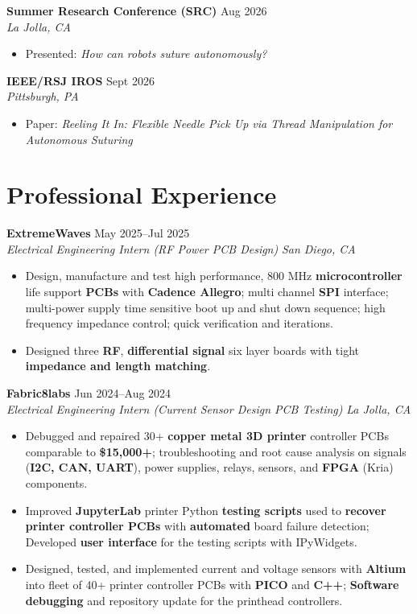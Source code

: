 \documentclass[11pt,a4paper]{article}
\newcommand{\resumeHeading}[4]{
  \vspace{0.15cm}
  \noindent\textbf{#1} \hfill #2 \\
  \noindent\textit{#3} \hfill \textit{#4} \par\vspace{0.1cm}
}
\newcommand{\resumeItem}[1]{
  \item\small{
    {#1 \vspace{-5pt}}
  }
}
\newcommand{\resumeItemListStart}{\begin{itemize}\vspace{-9pt}}
\newcommand{\resumeItemListEnd}{\end{itemize}\vspace{-5pt}}
\begin{document}
\resumeHeading{Summer Research Conference (SRC)}{Aug 2026}{}{La Jolla, CA}
\resumeItemListStart
    \resumeItem{Presented: \textit{How can robots suture autonomously?}}
\resumeItemListEnd

\resumeHeading{IEEE/RSJ IROS}{Sept 2026}{}{Pittsburgh, PA}
\resumeItemListStart
    \resumeItem{Paper: \textit{Reeling It In: Flexible Needle Pick Up via Thread Manipulation for Autonomous Suturing}}
\resumeItemListEnd

\section{Professional Experience}

\resumeHeading{ExtremeWaves}{May 2025--Jul 2025}{Electrical Engineering Intern (RF Power PCB Design)}{San Diego, CA}
\begin{itemize}[leftmargin=0.2in, itemsep=2pt, parsep=0pt, topsep=2pt]
    \item Design, manufacture and test high performance, 800 MHz \textbf{microcontroller} life support \textbf{PCBs} with \textbf{Cadence Allegro}; multi channel \textbf{SPI} interface; multi-power supply time sensitive boot up and shut down sequence; high frequency impedance control; quick verification and iterations.
    \item Designed three \textbf{RF}, \textbf{differential signal} six layer boards with tight \textbf{impedance and length matching}.
\end{itemize}

\resumeHeading{Fabric8labs}{Jun 2024--Aug 2024}{Electrical Engineering Intern (Current Sensor Design \textendash{} PCB Testing)}{La Jolla, CA}
\begin{itemize}[leftmargin=0.2in, itemsep=2pt, parsep=0pt, topsep=2pt]
    \item Debugged and repaired 30+ \textbf{copper metal 3D printer} controller PCBs comparable to \textbf{\$15,000+}; troubleshooting and root cause analysis on signals (\textbf{I2C, CAN, UART}), power supplies, relays, sensors, and \textbf{FPGA} (Kria) components.
    \item Improved \textbf{JupyterLab} printer Python \textbf{testing scripts} used to \textbf{recover printer controller PCBs} with \textbf{automated} board failure detection; Developed \textbf{user interface} for the testing scripts with IPyWidgets.
    \item Designed, tested, and implemented current and voltage sensors with \textbf{Altium} into fleet of 40+ printer controller PCBs with \textbf{PICO} and \textbf{C++}; \textbf{Software debugging} and repository update for the printhead controllers.
\end{itemize}
\end{document}

